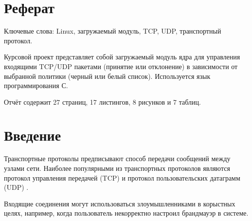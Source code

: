 
\newpage
\section*{Реферат}

Ключевые слова: Linux, загружаемый модуль, TCP, UDP, транспортный протокол. 

Курсовой проект представляет собой загружаемый модуль ядра для управления входящими TCP/UDP пакетами (принятие или отклонение) в зависимости от выбранной политики (черный или белый список). Используется язык программирования С.

Отчёт содержит 27 страниц, 17 листингов, 8 рисунков и 7 таблиц.

\newpage
\section*{Введение}

Транспортные протоколы предписывают способ передачи сообщений между узлами сети. Наиболее популярными из транспортных протоколов являются протокол управления передачей (TCP) и протокол пользовательских датаграмм (UDP) \cite{litlink1}. 

Входящие соединения могут использоваться злоумышленниками в корыстных целях, например, когда пользователь некорректно настроил брандмауэр в системе. 

